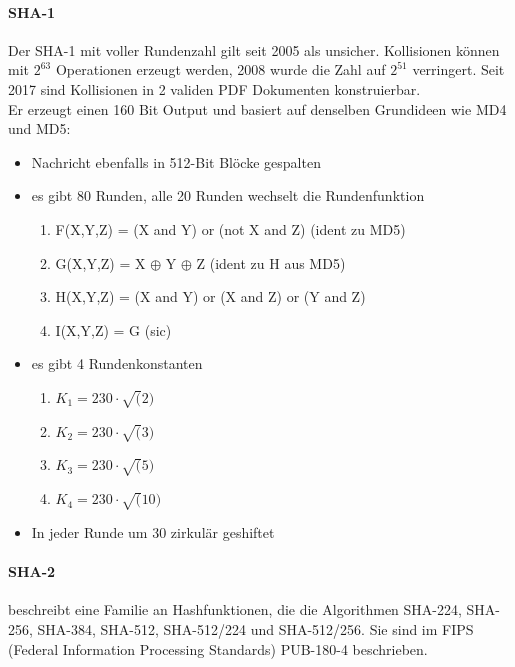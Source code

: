 \paragraph{SHA-1}
Der SHA-1 mit voller Rundenzahl gilt seit 2005 als unsicher. Kollisionen können mit $2^{63}$ Operationen erzeugt werden, 2008 wurde die Zahl auf $2^{51}$ verringert.
Seit 2017 sind Kollisionen in 2 validen PDF Dokumenten konstruierbar. \\

Er erzeugt einen 160 Bit Output und basiert auf denselben Grundideen wie MD4 und MD5:

\begin{itemize}
    \item Nachricht ebenfalls in 512-Bit Blöcke gespalten
    \item es gibt 80 Runden, alle 20 Runden wechselt die Rundenfunktion
    \begin{enumerate}
        \item F(X,Y,Z) = (X and Y) or (not X and Z) (ident zu MD5)
        \item G(X,Y,Z) = X $\oplus$ Y $\oplus$ Z (ident zu H aus MD5)
        \item H(X,Y,Z) = (X and Y) or (X and Z) or (Y and Z)
        \item I(X,Y,Z) = G (sic)
    \end{enumerate}
    \item es gibt 4 Rundenkonstanten
    \begin{enumerate}
        \item $K_1 = 230 \cdot \sqrt(2)$ 
        \item $K_2 = 230 \cdot \sqrt(3)$
        \item $K_3 = 230 \cdot \sqrt(5)$
        \item $K_4 = 230 \cdot \sqrt(10)$
    \end{enumerate}
    \item In jeder Runde um 30 zirkulär geshiftet
\end{itemize}

\paragraph{SHA-2} beschreibt eine Familie an Hashfunktionen, die die Algorithmen SHA-224, SHA-256, SHA-384, SHA-512, SHA-512/224 und SHA-512/256. Sie sind im 
FIPS 
(Federal Information Processing Standards) PUB-180-4 beschrieben.



